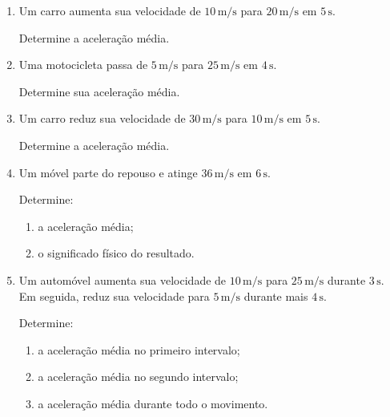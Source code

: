 \documentclass[a4paper,12pt]{article}
\begin{document}
\begin{enumerate}

\item Um carro aumenta sua velocidade de $10\,\text{m/s}$ para
$20\,\text{m/s}$ em $5\,\text{s}$.

Determine a aceleração média.

\vspace{1.5cm}


\item Uma motocicleta passa de $5\,\text{m/s}$ para $25\,\text{m/s}$
em $4\,\text{s}$.

Determine sua aceleração média.

\vspace{1.5cm}


\item Um carro reduz sua velocidade de $30\,\text{m/s}$ para
$10\,\text{m/s}$ em $5\,\text{s}$.

Determine a aceleração média.

\vspace{1.5cm}


\item Um móvel parte do repouso e atinge $36\,\text{m/s}$ em
$6\,\text{s}$.

Determine:

\begin{enumerate}
    \item a aceleração média;
    \item o significado físico do resultado.
\end{enumerate}

\vspace{1.5cm}


\item Um automóvel aumenta sua velocidade de $10\,\text{m/s}$ para
$25\,\text{m/s}$ durante $3\,\text{s}$. Em seguida, reduz sua velocidade
para $5\,\text{m/s}$ durante mais $4\,\text{s}$.

Determine:

\begin{enumerate}
    \item a aceleração média no primeiro intervalo;
    \item a aceleração média no segundo intervalo;
    \item a aceleração média durante todo o movimento.
\end{enumerate}

\end{enumerate}


\end{document}
